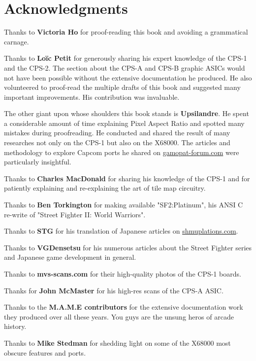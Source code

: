 \chapter*{Acknowledgments} 

Thanks to \textbf{Victoria Ho} for proof-reading this book and avoiding a grammatical carnage.

Thanks to \textbf{Lo\"{i}c Petit} for generously sharing his expert knowledge of the CPS-1 and the CPS-2. The section about the CPS-A and CPS-B graphic ASICs would not have been possible without the extensive documentation he produced. He also volunteered to proof-read the multiple drafts of this book and suggested many important improvements. His contribution was invaluable.

The other giant upon whose shoulders this book stands is \textbf{Upsilandre}. He spent a considerable amount of time explaining Pixel Aspect Ratio and spotted many mistakes during proofreading. He conducted and shared the result of many researches not only on the CPS-1 but also on the X68000. The articles and methodology to explore Capcom ports he shared on \href{https://www.gamopat-forum.com}{gamopat-forum.com} were particularly insightful.

Thanks to \textbf{Charles MacDonald} for sharing his knowledge of the CPS-1 and for patiently explaining and re-explaining the art of tile map circuitry.

Thanks to \textbf{Ben Torkington} for making available "SF2:Platinum", his ANSI C re-write of "Street Fighter II: World Warriors".

Thanks to \textbf{STG} for his translation of Japanese articles on \href{https://shmuplations.com}{shmuplations.com}.

Thanks to \textbf{VGDensetsu} for his numerous articles about the Street Fighter series and Japanese game development in general.

Thanks to \textbf{mvs-scans.com} for their high-quality photos of the CPS-1 boards.

Thanks for \textbf{John McMaster} for his high-res scans of the CPS-A ASIC.

Thanks to the \textbf{M.A.M.E contributors} for the extensive documentation work they produced over all these years. You guys are the unsung heros of arcade history.

Thanks to \textbf{Mike Stedman} for shedding light on some of the X68000 most obscure features and ports.